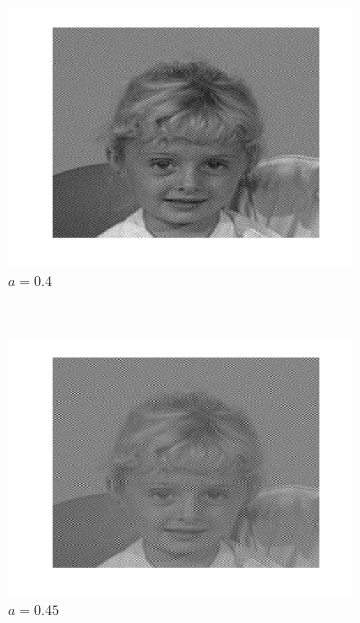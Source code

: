 \begin{figure}
  \centering
  \begin{subfigure}[b]{0.3\textwidth}
    \includegraphics[width=\textwidth]{Q2/unblurred_40.png}
    \caption{$a = 0.4$}
    \label{fig:a4}
  \end{subfigure}%
  ~ %
  \begin{subfigure}[b]{0.3\textwidth}
    \includegraphics[width=\textwidth]{Q2/unblurred_45.png}
    \caption{$a = 0.45$}
    \label{fig:a45}
  \end{subfigure}%
  ~
  \begin{subfigure}[b]{0.3\textwidth}

\end{subfigure}
\end{figure}

